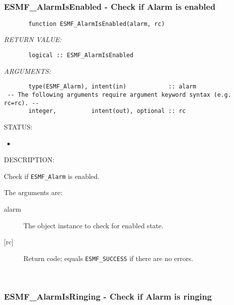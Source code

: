  
\mbox{}\hrulefill\ 
 
\subsubsection [ESMF\_AlarmIsEnabled] {ESMF\_AlarmIsEnabled - Check if Alarm is enabled}


 
\begin{verbatim}       function ESMF_AlarmIsEnabled(alarm, rc)\end{verbatim}{\em RETURN VALUE:}
\begin{verbatim}       logical :: ESMF_AlarmIsEnabled
 \end{verbatim}{\em ARGUMENTS:}
\begin{verbatim}       type(ESMF_Alarm), intent(in)            :: alarm
 -- The following arguments require argument keyword syntax (e.g. rc=rc). --
       integer,          intent(out), optional :: rc
 \end{verbatim}
{\sf STATUS:}
   \begin{itemize}
   \item{}
   \end{itemize}
  
{\sf DESCRIPTION:\\ }


       Check if {\tt ESMF\_Alarm} is enabled.
  
       The arguments are:
       \begin{description}
       \item[alarm]
            The object instance to check for enabled state.
       \item[{[rc]}]
            Return code; equals {\tt ESMF\_SUCCESS} if there are no errors.
       \end{description} 
 
\mbox{}\hrulefill\ 
 
\subsubsection [ESMF\_AlarmIsRinging] {ESMF\_AlarmIsRinging - Check if Alarm is ringing}


